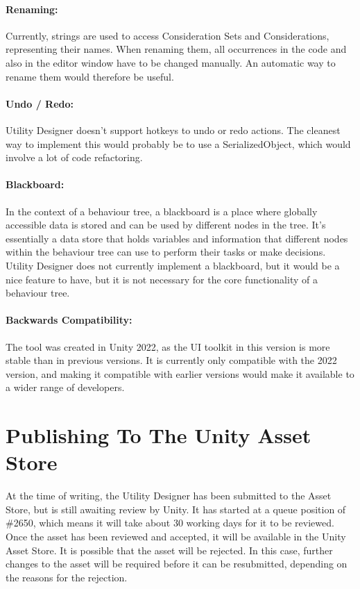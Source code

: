 \paragraph{Renaming:}
Currently, strings are used to access Consideration Sets and Considerations, representing their names. When renaming them, all occurrences in the code and also in the editor window have to be changed manually. An automatic way to rename them would therefore be useful.

\paragraph{Undo / Redo:}
Utility Designer doesn't support hotkeys to undo or redo actions. The cleanest way to implement this would probably be to use a SerializedObject, which would involve a lot of code refactoring.

\paragraph{Blackboard:}
In the context of a behaviour tree, a blackboard is a place where globally accessible data is stored and can be used by different nodes in the tree. It's essentially a data store that holds variables and information that different nodes within the behaviour tree can use to perform their tasks or make decisions. Utility Designer does not currently implement a blackboard, but it would be a nice feature to have, but it is not necessary for the core functionality of a behaviour tree.

\paragraph{Backwards Compatibility:}
The tool was created in Unity 2022, as the UI toolkit in this version is more stable than in previous versions. It is currently only compatible with the 2022 version, and making it compatible with earlier versions would make it available to a wider range of developers.

\section{Publishing To The Unity Asset Store}
\label{sec:nextsteps_publishtounityassetstore}

At the time of writing, the Utility Designer has been submitted to the Asset Store, but is still awaiting review by Unity. It has started at a queue position of \#2650, which means it will take about 30 working days for it to be reviewed. Once the asset has been reviewed and accepted, it will be available in the Unity Asset Store. It is possible that the asset will be rejected. In this case, further changes to the asset will be required before it can be resubmitted, depending on the reasons for the rejection.

